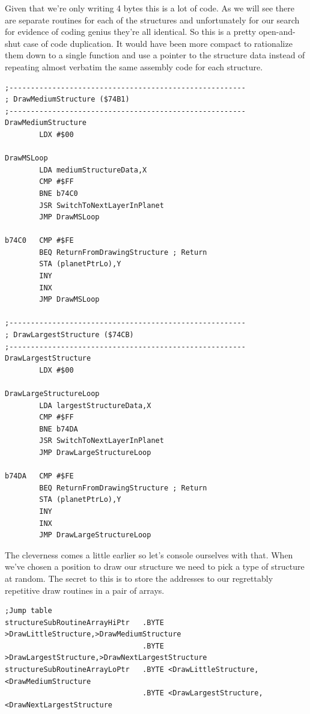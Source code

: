 Given that we're only writing 4 bytes this is a lot of code. As we will see there are separate routines for each
of the structures and unfortunately for our search for evidence of coding genius they're all identical. So this
is a pretty open-and-shut case of code duplication. It would have been more compact to rationalize them down to a single function
and use a pointer to the structure data instead of repeating almost verbatim the same assembly code for each
structure. 

\begin{lstlisting}[caption=\icode{DrawMediumStructure} and \icode{DrawLargestStructure} are identical to each other\, and to
\icode{DrawLittleStructure} and \icode{DrawNextLargestStructure}.]
;-------------------------------------------------------
; DrawMediumStructure ($74B1)
;-------------------------------------------------------
DrawMediumStructure
        LDX #$00

DrawMSLoop
        LDA mediumStructureData,X
        CMP #$FF
        BNE b74C0
        JSR SwitchToNextLayerInPlanet
        JMP DrawMSLoop

b74C0   CMP #$FE
        BEQ ReturnFromDrawingStructure ; Return
        STA (planetPtrLo),Y
        INY
        INX
        JMP DrawMSLoop

;-------------------------------------------------------
; DrawLargestStructure ($74CB)
;-------------------------------------------------------
DrawLargestStructure
        LDX #$00

DrawLargeStructureLoop
        LDA largestStructureData,X
        CMP #$FF
        BNE b74DA
        JSR SwitchToNextLayerInPlanet
        JMP DrawLargeStructureLoop

b74DA   CMP #$FE
        BEQ ReturnFromDrawingStructure ; Return
        STA (planetPtrLo),Y
        INY
        INX
        JMP DrawLargeStructureLoop
\end{lstlisting}

The cleverness comes a little earlier so let's console ourselves with that. When we've chosen a position to draw
our structure we need to pick a type of structure at random. The secret to this is to store the addresses to our
regrettably repetitive draw routines in a pair of arrays. 


\begin{lstlisting}[caption=A 'jump table' containing the addresses to our draw routines. The address for \icode{DrawLittleStructure} 
happens to be \$7486\, so we store \$74 in the first byte of \icode{structureSubRoutineArrayHiPtr} and \$86 in the first
byte of \icode{structureSubRoutineArrayLoPtr}.,basicstyle=\tiny]
;Jump table
structureSubRoutineArrayHiPtr   .BYTE >DrawLittleStructure,>DrawMediumStructure
                                .BYTE >DrawLargestStructure,>DrawNextLargestStructure
structureSubRoutineArrayLoPtr   .BYTE <DrawLittleStructure,<DrawMediumStructure
                                .BYTE <DrawLargestStructure,<DrawNextLargestStructure
\end{lstlisting}

